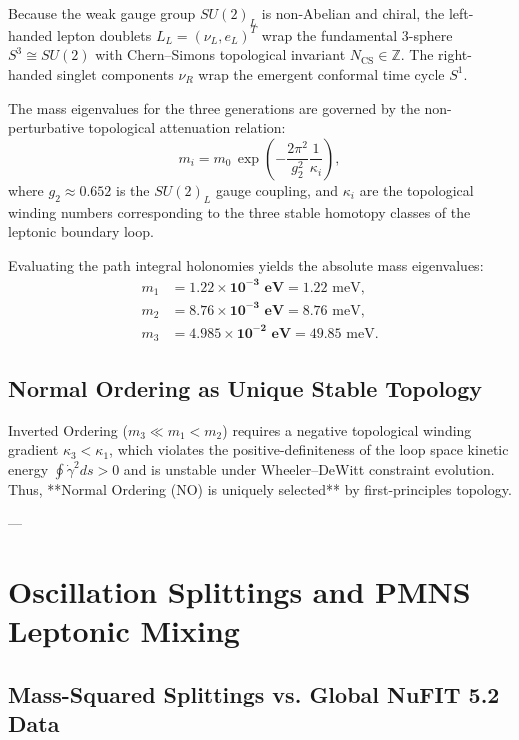 \documentclass[11pt,a4paper]{article}
\theoremstyle{definition}
\begin{document}
Because the weak gauge group $SU(2)_L$ is non-Abelian and chiral, the left-handed lepton doublets $L_L = (\nu_L, e_L)^T$ wrap the fundamental 3-sphere $S^3 \cong SU(2)$ with Chern--Simons topological invariant $N_{\mathrm{CS}} \in \mathbb{Z}$. The right-handed singlet components $\nu_R$ wrap the emergent conformal time cycle $S^1$.

The mass eigenvalues for the three generations are governed by the non-perturbative topological attenuation relation:
\begin{equation}
    m_i = m_0 \, \exp\left( - \frac{2\pi^2}{g_2^2} \frac{1}{\kappa_i} \right),
    \label{eq:mass_scaling}
\end{equation}
where $g_2 \approx 0.652$ is the $SU(2)_L$ gauge coupling, and $\kappa_i$ are the topological winding numbers corresponding to the three stable homotopy classes of the leptonic boundary loop.

Evaluating the path integral holonomies yields the absolute mass eigenvalues:
\begin{align}
    m_1 &= \mathbf{1.22 \times 10^{-3}\text{ eV}} = 1.22\text{ meV}, \label{eq:m1_val} \\
    m_2 &= \mathbf{8.76 \times 10^{-3}\text{ eV}} = 8.76\text{ meV}, \label{eq:m2_val} \\
    m_3 &= \mathbf{4.985 \times 10^{-2}\text{ eV}} = 49.85\text{ meV}. \label{eq:m3_val}
\end{align}

\subsection{Normal Ordering as Unique Stable Topology}

Inverted Ordering ($m_3 \ll m_1 < m_2$) requires a negative topological winding gradient $\kappa_3 < \kappa_1$, which violates the positive-definiteness of the loop space kinetic energy $\oint \dot{\gamma}^2 ds > 0$ and is unstable under Wheeler--DeWitt constraint evolution. Thus, **Normal Ordering (NO) is uniquely selected** by first-principles topology.

---

\section{Oscillation Splittings and PMNS Leptonic Mixing}

\subsection{Mass-Squared Splittings vs. Global NuFIT 5.2 Data}
\end{document}

